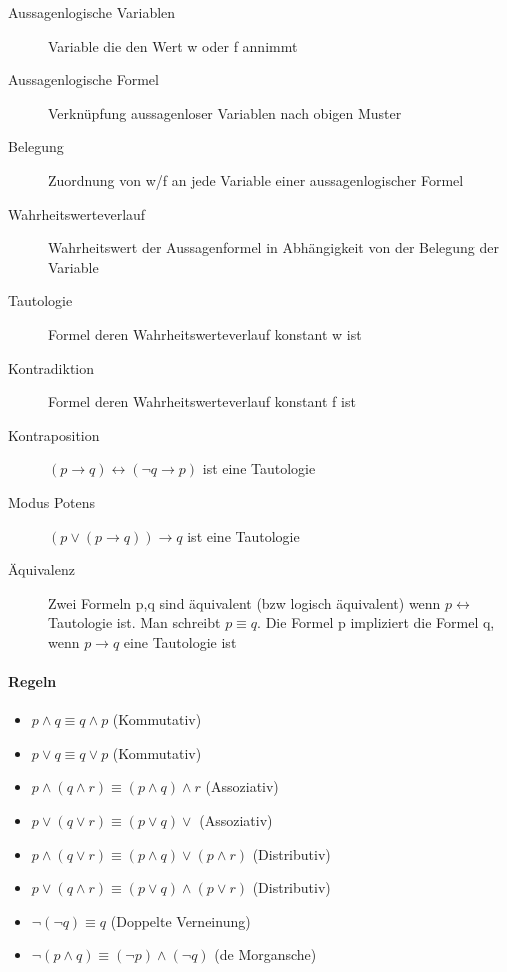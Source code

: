 \documentclass[10pt,landscape]{article}
\begin{document}
\begin{multicols}{3}
\begin{description}
    \item[Aussagenlogische Variablen] Variable die den Wert w oder f annimmt
    \item[Aussagenlogische Formel] Verknüpfung aussagenloser Variablen nach obigen Muster
    \item[Belegung] Zuordnung von w/f an jede Variable einer aussagenlogischer Formel
    \item[Wahrheitswerteverlauf] Wahrheitswert der Aussagenformel in Abhängigkeit von der Belegung der Variable
    \item[Tautologie] Formel deren Wahrheitswerteverlauf konstant w ist
    \item[Kontradiktion] Formel deren Wahrheitswerteverlauf konstant f ist
    \item[Kontraposition] $(p\rightarrow q)\leftrightarrow (\neg q \rightarrow p)$ ist eine Tautologie
    \item[Modus Potens] $(p\vee (p\rightarrow q))\rightarrow q$ ist eine Tautologie
    \item[Äquivalenz] Zwei Formeln p,q sind äquivalent (bzw logisch äquivalent) wenn $p\leftrightarrow$ Tautologie ist. Man schreibt $p \equiv q$. Die Formel p impliziert die Formel q, wenn $p\rightarrow q$ eine Tautologie ist
\end{description}

\paragraph{Regeln}
\begin{itemize}
    \item $p\wedge q \equiv q \wedge p$ (Kommutativ)
    \item $p\vee q \equiv q \vee p$ (Kommutativ)
    \item $p\wedge (q \wedge r) \equiv (p \wedge q) \wedge r$ (Assoziativ)
    \item $p\vee ( q \vee r) \equiv (p \vee q) \vee$ (Assoziativ)
    \item $p\wedge (q\vee r) \equiv (p\wedge q) \vee (p\wedge r)$ (Distributiv)
    \item $p\vee (q\wedge r) \equiv (p\vee q) \wedge (p\vee r)$ (Distributiv)
    \item $\neg(\neg q) \equiv q$ (Doppelte Verneinung)
    \item $\neg(p\wedge q) \equiv (\neg p) \wedge (\neg q)$ (de Morgansche)
\end{itemize}


\end{multicols}
\end{document}
